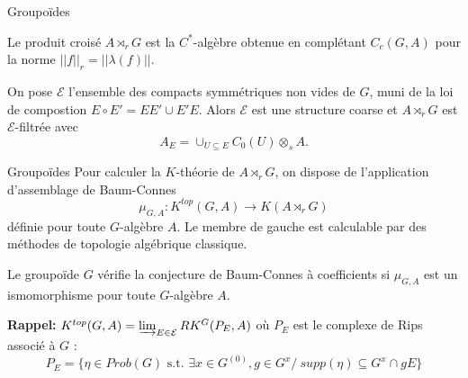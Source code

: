 \begin{frame}{Groupoïdes}
\begin{definitionfr}
Le produit croisé $A\rtimes_r G$ est la $C^*$-algèbre obtenue en complétant $C_c(G,A)$ pour la norme $||f||_r=||\lambda(f)||$.
\end{definitionfr}
\vspace{0.3 cm}
On pose $\mathcal E$ l'ensemble des compacts symmétriques non vides de $G$, muni de la loi de compostion $E\circ E' = EE' \cup E'E$. Alors $\mathcal E$ est une structure coarse et $A\rtimes_r G$ est $\mathcal E$-filtrée avec
\[A_E = \cup_{U\subseteq E	} C_0(U)\otimes_s A.\] 
\end{frame}

\begin{frame}{Groupoïdes}
Pour calculer la $K$-théorie de $A\rtimes_r G$, on dispose de l'application d'assemblage de Baum-Connes
\[\mu_{G,A} : K^{top}(G,A) \rightarrow K(A \rtimes_r G)\]
définie pour toute $G$-algèbre $A$. Le membre de gauche est calculable par des méthodes de topologie algébrique classique.
\vspace{0.3 cm}
\begin{conj}
Le groupoïde $G$ vérifie la conjecture de Baum-Connes à coefficients si $\mu_{G,A}$ est un ismomorphisme pour toute $G$-algèbre $A$.
\end{conj}
\vspace{0.3 cm}
\textbf{Rappel:} $K^{top}(G,A)=\varinjlim_{E\in \mathcal E} RK^G(P_E,A)$ où $P_E$ est le complexe de Rips associé à $G$ :
\[P_E = \{\eta\in Prob(G) \text{ s.t. } \exists x\in G^{(0)},g\in G^x / \ supp (\eta) \subseteq G^x \cap gE  \}\]
\end{frame}

